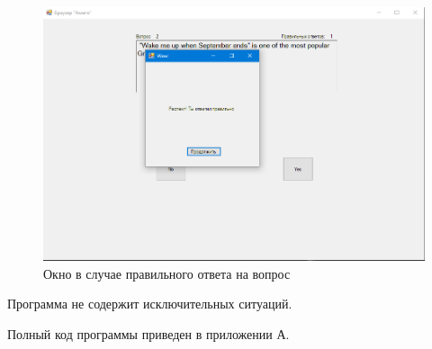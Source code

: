 \begin{figure}[H]
    \centering
    \includegraphics[scale=0.6]{task9/result.png}
    \caption{Окно в случае правильного ответа на вопрос}
\end{figure}
Программа не содержит исключительных ситуаций.


Полный код программы приведен в приложении А.

